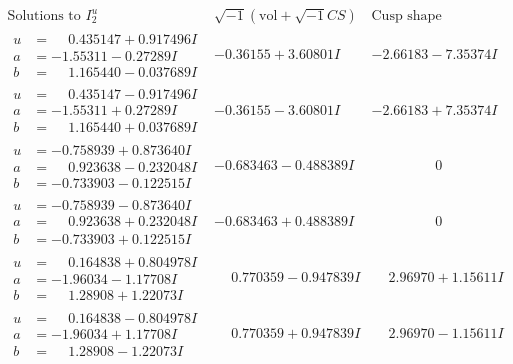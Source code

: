 \documentclass[1p]{elsarticle_modified}
\theoremstyle{definition}
\newcommand{\I}{\sqrt{-1}}
\begin{document}
$$\begin{array}{c|c|c}  
\text{Solutions to }I^u_{2}& \I (\text{vol} + \sqrt{-1}CS) & \text{Cusp shape}\\
 \hline 
\begin{aligned}
u &= \phantom{-}0.435147 + 0.917496 I \\
a &= -1.55311 - 0.27289 I \\
b &= \phantom{-}1.165440 - 0.037689 I\end{aligned}
 & -0.36155 + 3.60801 I & -2.66183 - 7.35374 I \\ \hline\begin{aligned}
u &= \phantom{-}0.435147 - 0.917496 I \\
a &= -1.55311 + 0.27289 I \\
b &= \phantom{-}1.165440 + 0.037689 I\end{aligned}
 & -0.36155 - 3.60801 I & -2.66183 + 7.35374 I \\ \hline\begin{aligned}
u &= -0.758939 + 0.873640 I \\
a &= \phantom{-}0.923638 - 0.232048 I \\
b &= -0.733903 - 0.122515 I\end{aligned}
 & -0.683463 - 0.488389 I & \phantom{-0.000000 } 0 \\ \hline\begin{aligned}
u &= -0.758939 - 0.873640 I \\
a &= \phantom{-}0.923638 + 0.232048 I \\
b &= -0.733903 + 0.122515 I\end{aligned}
 & -0.683463 + 0.488389 I & \phantom{-0.000000 } 0 \\ \hline\begin{aligned}
u &= \phantom{-}0.164838 + 0.804978 I \\
a &= -1.96034 - 1.17708 I \\
b &= \phantom{-}1.28908 + 1.22073 I\end{aligned}
 & \phantom{-}0.770359 - 0.947839 I & \phantom{-}2.96970 + 1.15611 I \\ \hline\begin{aligned}
u &= \phantom{-}0.164838 - 0.804978 I \\
a &= -1.96034 + 1.17708 I \\
b &= \phantom{-}1.28908 - 1.22073 I\end{aligned}
 & \phantom{-}0.770359 + 0.947839 I & \phantom{-}2.96970 - 1.15611 I \\ \hline\begin{aligned}

\end{aligned}
\end{array}$$
\end{document}
